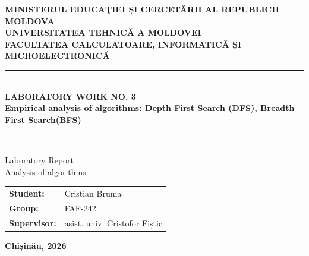\documentclass[12pt, a4paper]{report}
\newcommand{\ReportTitle}{Laboratory Work No. 3}
\newcommand{\ReportSubtitle}{Empirical analysis of algorithms: Depth First Search (DFS), Breadth First Search(BFS)}
\newcommand{\StudentName}{Cristian Bruma}
\newcommand{\GroupName}{FAF-242}
\newcommand{\SupervisorName}{asist. univ.  Cristofor Fiștic}
\newcommand{\Ministry}{Ministerul Educaţiei și Cercetării al Republicii Moldova}
\newcommand{\UniversityName}{Universitatea Tehnică a Moldovei}
\newcommand{\DepartmentName}{Facultatea Calculatoare, Informatică și Microelectronică}
\newcommand{\AcademicYear}{2026}
\begin{document}
\begin{titlepage}
  \thispagestyle{empty}        %
  \begin{center}
    \textbf{\MakeUppercase{\Ministry}}\\[4pt]
    \textbf{\MakeUppercase{\UniversityName}}\\[4pt]
    \textbf{\MakeUppercase{\DepartmentName}}\\[40pt]

    \rule{\linewidth}{0.5pt}\\[6pt]
    {\Large\bfseries\MakeUppercase{\ReportTitle}}\\[4pt]
    {\large\bfseries\ReportSubtitle}\\[6pt]
    \rule{\linewidth}{0.5pt}\\[30pt]

    {\Large Laboratory Report}\\[4pt]
    {\Large Analysis of algorithms}\\[60pt]
  \end{center}

  \begin{flushleft}
    \begin{tabular}{ll}
      \Large\textbf{Student:}    & \Large\StudentName \\
      \Large\textbf{Group:}      & \Large\GroupName   \\
      \Large\textbf{Supervisor:} & \Large\SupervisorName \\
    \end{tabular}
  \end{flushleft}

  \vfill
  \begin{center}
    \Large\textbf{Chișinău, \AcademicYear}
  \end{center}
\end{titlepage}

\setcounter{page}{1}

\newpage
\renewcommand{\contentsname}{TABLE OF CONTENTS}
\renewcommand{\cfttoctitlefont}{\hfill\fontsize{13pt}{15pt}\bfseries}
\renewcommand{\cftaftertoctitle}{\hfill}
\tableofcontents
\thispagestyle{plain}          %

\end{document}
